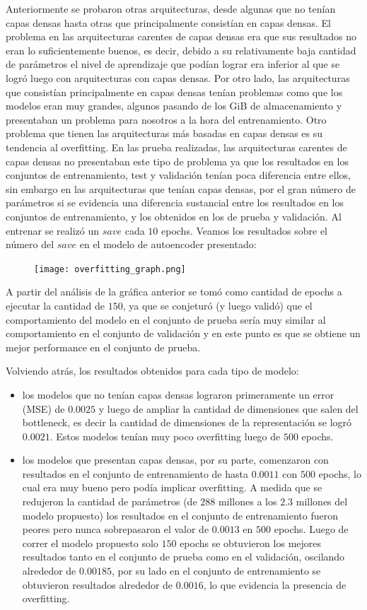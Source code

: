 \documentclass[colorinlistoftodos,twoside,twocolumn,10pt]{article} %
\begin{document}
Anteriormente se probaron otras arquitecturas, desde algunas que no tenían capas densas hasta otras que principalmente consistían en capas densas. El problema en las arquitecturas carentes de capas densas era que sus resultados no eran lo suficientemente buenos, es decir, debido a su relativamente baja cantidad de parámetros el nivel de aprendizaje que podían lograr era inferior al que se logró luego con arquitecturas con capas densas. Por otro lado, las arquitecturas que consistían principalmente en capas densas tenían problemas como que los modelos eran muy grandes, algunos pasando de los GiB de almacenamiento y presentaban un problema para nosotros a la hora del entrenamiento. Otro problema que tienen las arquitecturas más basadas en capas densas es su tendencia al overfitting. En las prueba realizadas, las arquitecturas carentes de capas densas no presentaban este tipo de problema ya que los resultados en los conjuntos de entrenamiento, test y validación tenían poca diferencia entre ellos, sin embargo en las arquitecturas que tenían capas densas, por el gran número de parámetros si se evidencia una diferencia sustancial entre los resultados en los conjuntos de entrenamiento, y los obtenidos en los de prueba y validación. Al entrenar se realizó un $save$ cada $10$ epochs. Veamos los resultados sobre el número del $save$ en el modelo de autoencoder presentado:

\begin{figure}[h!]
	\texttt{[image: overfitting\_graph.png]}
\end{figure}

A partir del análisis de la gráfica anterior se tomó como cantidad de epochs a ejecutar la cantidad de $150$, ya que se conjeturó (y luego validó) que el comportamiento del modelo en el conjunto de prueba sería muy similar al comportamiento en el conjunto de validación y en este punto es que se obtiene un mejor performance en el conjunto de prueba. 

Volviendo atrás, los resultados obtenidos para cada tipo de modelo:
\begin{itemize}
	\item los modelos que no tenían capas densas lograron primeramente un error (MSE) de $0.0025$ y luego de ampliar la   cantidad de dimensiones que salen del bottleneck, es decir la cantidad de dimensiones de la representación se logró $0.0021$. Estos modelos tenían muy poco overfitting luego de $500$ epochs.
	\item los modelos que presentan capas densas, por su parte, comenzaron con resultados en el conjunto de entrenamiento de hasta $0.0011$ con $500$ epochs, lo cual era muy bueno pero podía implicar overfitting. A medida que se redujeron la cantidad de parámetros (de $288$ millones a los $2.3$ millones del modelo propuesto) los resultados en el conjunto de entrenamiento fueron peores pero nunca sobrepasaron el valor de $0.0013$ en $500$ epochs. Luego de correr el modelo propuesto solo $150$ epochs se obtuvieron los mejores resultados tanto en el conjunto de prueba como en el validación, oscilando alrededor de $0.00185$, por su lado en el conjunto de entrenamiento se obtuvieron resultados alrededor de $0.0016$, lo que evidencia la presencia de overfitting.
\end{itemize}
\end{document}
